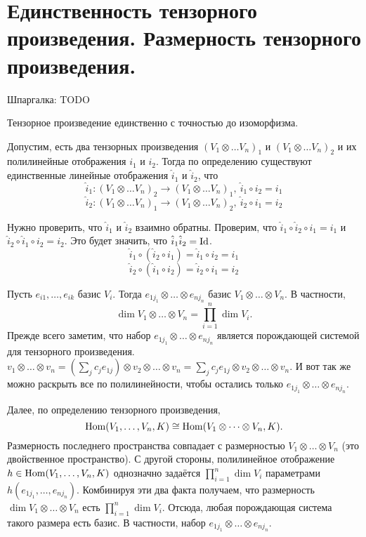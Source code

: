 \section{
 Единственность тензорного произведения. Размерность тензорного произведения.
}

Шпаргалка: TODO

\thrm Тензорное произведение единственно с точностью до изоморфизма.
\proof

Допустим, есть два тензорных произведения $(V_1 \otimes \dots V_n)_1$ и $(V_1 \otimes \dots V_n)_2$ и их полилинейные отображения $i_1$ и $i_2$. Тогда по определению существуют единственные линейные отображения $\hat{i}_1$ и $\hat{i}_2$, что
$$\hat{i}_1 \colon (V_1 \otimes \dots V_n)_2 \to (V_1 \otimes \dots V_n)_1, \ \hat{i}_1 \circ i_2 = i_1$$
$$\hat{i}_2 \colon (V_1 \otimes \dots V_n)_1 \to (V_1 \otimes \dots V_n)_2, \ \hat{i}_2 \circ i_1 = i_2$$

Нужно проверить, что $\hat{i}_1$ и $\hat{i}_2$ взаимно обратны. Проверим, что $\hat{i}_1 \circ \hat{i}_2 \circ i_1 = i_1$ и $\hat{i}_2 \circ \hat{i}_1 \circ i_2 = i_2$. Это будет значить, что $\hat{i}_1\hat{i}_2 = \operatorname{Id}$.
$$\hat{i}_1 \circ (\hat{i}_2 \circ i_1) = \hat{i}_1 \circ i_2 = i_1$$
$$\hat{i}_2 \circ (\hat{i}_1 \circ i_2) = \hat{i}_2 \circ i_1 = i_2$$
\endproof
\ethrm

\thrm Пусть $e_{i1},\dots,e_{ik}$ базис $V_i$. Тогда $e_{1j_1}\otimes \dots \otimes e_{nj_n}$ базис $V_1 \otimes \dots \otimes V_n$. В частности, 
$$\dim V_1 \otimes \dots \otimes V_n= \prod_{i=1}^n \dim V_i.$$ 
\proof Прежде всего заметим, что набор $e_{1j_1}\otimes \dots \otimes e_{nj_n}$ является порождающей системой для тензорного произведения.
$v_1 \otimes \dots \otimes v_n = (\sum\limits_{j}c_je_{1j})\otimes v_2 \otimes \dots \otimes v_n =
\sum\limits_{j}c_je_{1j}\otimes v_2 \otimes \dots \otimes v_n$. И вот так же можно раскрыть все по полилинейности, чтобы остались только $e_{1j_1}\otimes \dots \otimes e_{nj_n}$.

Далее, по определению тензорного произведения,
$$\operatorname{Hom}(V_1,\dots,V_n, K) \cong \operatorname{Hom}(V_1\otimes \dots \otimes V_n,K).$$
Размерность последнего пространства совпадает с размерностью $V_1\otimes \dots \otimes V_n$ (это двойственное пространство). С другой стороны, полилинейное отображение $h \in \operatorname{Hom}(V_1,\dots,V_n, K)$ однозначно задаётся $\prod_{i=1}^n \dim V_i$  параметрами $h(e_{1j_1}, \dots,e_{nj_n})$. Комбинируя эти два факта получаем, что размерность $\dim V_1 \otimes \dots \otimes V_n$ есть $\prod_{i=1}^n \dim V_i$. Отсюда, любая порождающая система такого размера есть базис. В частности, набор $e_{1j_1}\otimes \dots \otimes e_{nj_n}$.
\endproof
\ethrm